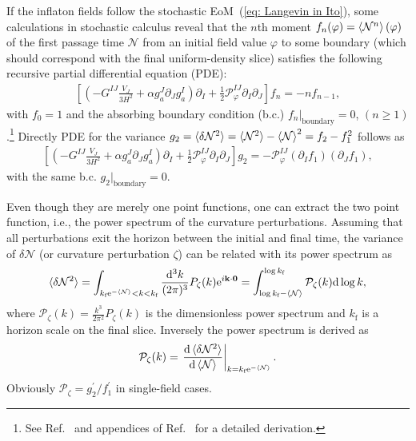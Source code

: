 \documentclass[aps, prd
, preprint
, nofootinbib 
, superscriptaddress
, longbibliography
]{revtex4-1}
\newcommand{\dif}[2]{\frac{\mathrm{d} #1}{\mathrm{d} #2}}
\newcommand{\dd}{\mathrm{d}}
\newcommand{\ee}{\mathrm{e}}
\newcommand{\dk}{\frac{\dd^3k}{(2\pi)^3}}
\newcommand{\uf}{\text{f}}
\newcommand{\calN}{\mathcal{N}}
\newcommand{\calP}{\mathcal{P}}
\newcommand{\bae}[1]{\begin{align} #1 \end{align}}
\begin{document}
If the inflaton fields follow the stochastic EoM~(\ref{eq: Langevin in Ito}),
some calculations in stochastic calculus reveal that the $n$th moment $f_n(\varphi)=\braket{\calN^n}(\varphi)$ of the first passage time $\calN$ from
an initial field value $\varphi$ to some boundary 
(which should correspond with the final uniform-density slice) satisfies the following recursive partial differential equation (PDE):
\bae{\label{eq: fn PDE}
	\left[\left(-G^{IJ}\frac{V_J}{3H^2}+\alpha g^J_a\partial_Jg^I_a\right)\partial_I+\frac{1}{2}\calP_\varphi^{IJ}\partial_I\partial_J\right]f_n=-nf_{n-1},
}
with $f_0=1$ and the absorbing boundary condition (b.c.) $f_n|_\text{boundary}=0$, $(n\ge1)$.\footnote{See Ref.~\cite{Vennin:2015hra} and appendices of 
Ref.~\cite{Assadullahi:2016gkk} for a detailed derivation.} Directly PDE for the variance $g_2=\braket{\delta\calN^2}=\braket{\calN^2}-\braket{\calN}^2=f_2-f_1^2$
follows as
\bae{\label{eq: g2 PDE}
	\left[\left(-G^{IJ}\frac{V_J}{3H^2}+\alpha g^J_a\partial_Jg^I_a\right)\partial_I+\frac{1}{2}\calP_\varphi^{IJ}\partial_I\partial_J\right]g_2
	=-\calP_\varphi^{IJ}(\partial_If_1)(\partial_Jf_1),
}
with the same b.c. $g_2|_\text{boundary}=0$.

Even though they are merely one point functions, one can extract the two point function, i.e., the power spectrum of the curvature perturbations.
Assuming that all perturbations exit the horizon between the initial and final time, the variance of $\delta\calN$ (or curvature perturbation $\zeta$) can be related with
its power spectrum as
\bae{
	\braket{\delta\calN^2}=\int_{k_\uf\ee^{-\braket{\calN}}<k<k_\uf}\dk P_\zeta(k)\ee^{i\mathbf{k}\cdot\mathbf{0}}
	=\int_{\log k_\uf-\braket{\calN}}^{\log k_\uf}\calP_\zeta(k)\dd\log k,
}
where $\calP_\zeta(k)=\frac{k^3}{2\pi^2}P_\zeta(k)$ is the dimensionless power spectrum and $k_\uf$ is a horizon scale on the final slice.
Inversely the power spectrum is derived as
\bae{
	\calP_\zeta(k)=\left.\dif{\braket{\delta\calN^2}}{\braket{\calN}}\right|_{k=k_\uf\ee^{-\braket{\calN}}}.
}
Obviously $\calP_\zeta=g_2^\prime/f_1^\prime$ in single-field cases.
\end{document}
